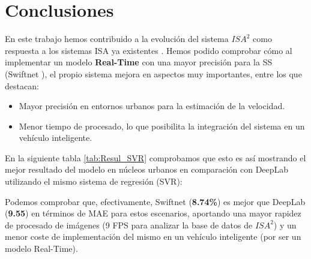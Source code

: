 \chapter{Conclusiones}

En este trabajo hemos contribuido a la evolución del sistema $ISA^{2}$ como respuesta a los sistemas \ac{ISA} ya existentes \cite{isa2}. Hemos podido comprobar cómo al implementar un modelo \textbf{Real-Time} con una mayor precisión para la \ac{SS} (Swiftnet \cite{swiftnet}), el propio sistema mejora en aspectos muy importantes, entre los que destacan:

\begin{itemize}
\item Mayor precisión en entornos urbanos para la estimación de la velocidad.
\item Menor tiempo de procesado, lo que posibilita la integración del sistema en un vehículo inteligente.
\end{itemize}


En la siguiente tabla \ref{tab:Resul_SVR} comprobamos que esto es así mostrando el mejor resultado del modelo en núcleos urbanos en comparación con DeepLab utilizando el mismo sistema de regresión (\ac{SVR}): 

\begin{table}[H]
\centering
{}
\caption{Resultados de \ac{SVR}}
\label{tab:Resul_SVR}
\end{table}

Podemos comprobar que, efectivamente, Swiftnet (\textbf{8.74\%}) es mejor que DeepLab (\textbf{9.55}) en términos de \ac{MAE} para estos escenarios, aportando una mayor rapidez de procesado de imágenes (9 \ac{FPS} para analizar la base de datos de $ISA^{2}$) y un menor coste de implementación del mismo en un vehículo inteligente (por ser un modelo Real-Time). 

